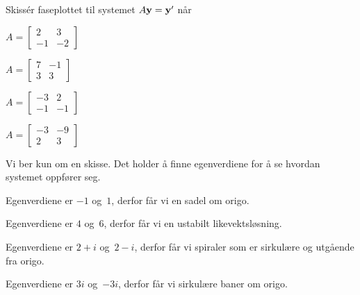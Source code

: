 

\begin{oppgave}
Skissér faseplottet til systemet $A\mathbf{y}=\mathbf{y}'$ når
\begin{punkt}
$A= \begin{bmatrix}
2 & 3\\
-1 & -2
\end{bmatrix}
$	
\end{punkt}

\begin{punkt}
	$A= \begin{bmatrix}
	7 & -1\\
	3 & 3
	\end{bmatrix}
	$	
\end{punkt}

\begin{punkt}
	$A= \begin{bmatrix}
	-3 & 2\\
	-1 & -1
	\end{bmatrix}
	$	
\end{punkt}

\begin{punkt}
	$A= \begin{bmatrix}
	-3 & -9\\
	2 & 3
	\end{bmatrix}
	$	
\end{punkt}

\end{oppgave}


\begin{losning}
Vi ber kun om en skisse. Det holder å finne egenverdiene for å se hvordan systemet oppfører seg.
	\begin{punkt}
		Egenverdiene er $-1$ og~$1$, derfor får vi en sadel om origo.
	\end{punkt}
	
	\begin{punkt}
		Egenverdiene er $4$ og~$6$, derfor får vi en ustabilt likevektsløsning.
	\end{punkt}
	
	\begin{punkt}
		Egenverdiene er $2+i$ og~$2-i$, derfor får vi spiraler som er sirkulære og utgående fra origo.
	\end{punkt}
	
	\begin{punkt}
		Egenverdiene er $3i$ og~$-3i$, derfor får vi sirkulære baner om origo.
	\end{punkt}
	
\end{losning}


